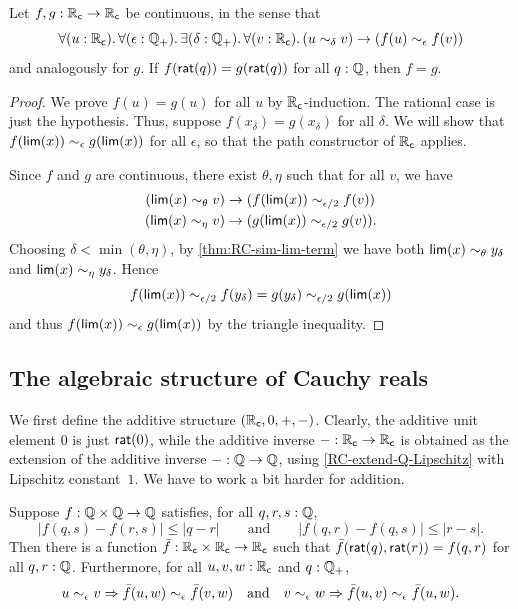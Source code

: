 \begin{lem}\label{RC-continuous-eq}
  Let $f,g:\mathbb{R}_\mathsf{c}\to\mathbb{R}_\mathsf{c}$ be continuous, in the sense that
  \[ \fall{u:\RC}{\epsilon:\Qp}\exis{\delta:\Qp}\fall{v:\RC} (u\close\delta v) \to (f(u) \close\epsilon f(v)) \]
  and analogously for $g$.
  If $f(\mathsf{rat}(q))=g(\mathsf{rat}(q))$ for all $q:\mathbb{Q}$, then $f=g$.
\end{lem}
\begin{proof}
  We prove $f(u)=g(u)$ for all $u$ by $\mathbb{R}_\mathsf{c}$-induction.
  The rational case is just the hypothesis.
  Thus, suppose $f(x_\delta)=g(x_\delta)$ for all $\delta$.
  We will show that $f(\mathsf{lim}(x))\sim_{\epsilon} g(\mathsf{lim}(x))$ for all $\epsilon$, so that the path constructor of $\mathbb{R}_\mathsf{c}$ applies.

  Since $f$ and $g$ are continuous, there exist $\theta,\eta$ such that for all $v$, we have
  \begin{align*}
    (\mathsf{lim}(x)\sim_{\theta} v) &\to (f(\mathsf{lim}(x)) \sim_{\epsilon/2} f(v))\\
    (\mathsf{lim}(x)\sim_{\eta} v) &\to (g(\mathsf{lim}(x)) \sim_{\epsilon/2} g(v)).
  \end{align*}
  Choosing $\delta < \min(\theta,\eta)$, by \cref{thm:RC-sim-lim-term} we have both $\mathsf{lim}(x)\sim_{\theta} y_\delta$ and $\mathsf{lim}(x)\sim_{\eta} y_\delta$.
  Hence
  \[ f(\mathsf{lim}(x)) \sim_{\epsilon/2} f(y_\delta) = g(y_\delta) \sim_{\epsilon/2} g(\mathsf{lim}(x))\]
  and thus $f(\mathsf{lim}(x))\sim_{\epsilon} g(\mathsf{lim}(x))$ by the triangle inequality.
\end{proof}

\subsection{The algebraic structure of Cauchy reals}
\label{sec:algebr-struct-cauchy}

We first define the additive structure $(\mathbb{R}_\mathsf{c}, 0, {+}, {-})$. Clearly, the additive unit element
$0$ is just $\mathsf{rat}(0)$, while the additive inverse ${-} : \mathbb{R}_\mathsf{c} \to \mathbb{R}_\mathsf{c}$ is obtained as the
extension of the additive inverse ${-} : \mathbb{Q} \to \mathbb{Q}$, using \cref{RC-extend-Q-Lipschitz}
with Lipschitz constant~$1$. We have to work a bit harder for addition.

\begin{lem} \label{RC-binary-nonexpanding-extension}
  Suppose $f : \mathbb{Q} \times \mathbb{Q} \to \mathbb{Q}$ satisfies, for all $q, r, s : \mathbb{Q}$,
  \begin{equation*}
    |f(q, s) - f(r, s)| \leq |q - r|
    \qquad\text{and}\qquad
    |f(q, r) - f(q, s)| \leq |r - s|.
  \end{equation*}
  Then there is a function $\bar{f} : \mathbb{R}_\mathsf{c} \times \mathbb{R}_\mathsf{c} \to \mathbb{R}_\mathsf{c}$ such that
  $\bar{f}(\mathsf{rat}(q), \mathsf{rat}(r)) = f(q,r)$ for all $q, r : \mathbb{Q}$. Furthermore,
  for all $u, v, w : \mathbb{R}_\mathsf{c}$ and $q : \mathbb{Q}_{+}$,
  \begin{equation*}
    u \sim_{\epsilon} v \Rightarrow \bar{f}(u,w) \sim_{\epsilon} \bar{f}(v,w)
    \quad\text{and}\quad
    v \sim_{\epsilon} w \Rightarrow \bar{f}(u,v) \sim_{\epsilon} \bar{f}(u,w).
  \end{equation*}
\end{lem}

